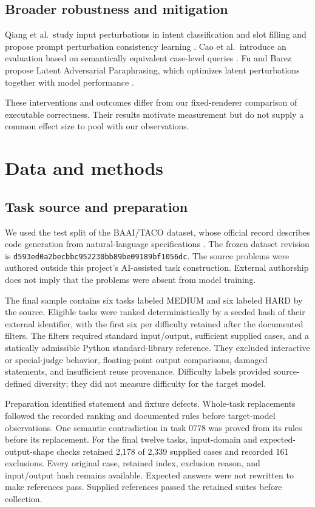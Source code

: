 \documentclass[conference,a4paper]{IEEEtran}
\newcommand{\evidencecite}[3]{\cite[#3]{#2}}
\begin{document}
\subsection{Broader robustness and mitigation}
Qiang et al.\ study input perturbations in intent classification and slot filling and propose prompt perturbation consistency learning \evidencecite{C06}{qiang-etal-2024-prompt}{p.~1357}. Cao et al.\ introduce an evaluation based on semantically equivalent case-level queries \evidencecite{C09}{NEURIPS2024_7fa5a377}{p.~1}. Fu and Barez propose Latent Adversarial Paraphrasing, which optimizes latent perturbations together with model performance \evidencecite{C10}{fu-barez-2025-question}{p.~31305}.

These interventions and outcomes differ from our fixed-renderer comparison of executable correctness. Their results motivate measurement but do not supply a common effect size to pool with our observations.

\section{Data and methods}
\subsection{Task source and preparation}
We used the test split of the BAAI/TACO dataset, whose official record describes code generation from natural-language specifications \evidencecite{C11}{taco-dataset}{dataset card}. The frozen dataset revision is \texttt{d593ed0a2becbbc952230bb89be09189bf1056dc}. The source problems were authored outside this project's AI-assisted task construction. External authorship does not imply that the problems were absent from model training.

The final sample contains six tasks labeled MEDIUM and six labeled HARD by the source. Eligible tasks were ranked deterministically by a seeded hash of their external identifier, with the first six per difficulty retained after the documented filters. The filters required standard input/output, sufficient supplied cases, and a statically admissible Python standard-library reference. They excluded interactive or special-judge behavior, floating-point output comparisons, damaged statements, and insufficient reuse provenance. Difficulty labels provided source-defined diversity; they did not measure difficulty for the target model.

Preparation identified statement and fixture defects. Whole-task replacements followed the recorded ranking and documented rules before target-model observations. One semantic contradiction in task 0778 was proved from its rules before its replacement. For the final twelve tasks, input-domain and expected-output-shape checks retained 2,178 of 2,339 supplied cases and recorded 161 exclusions. Every original case, retained index, exclusion reason, and input/output hash remains available. Expected answers were not rewritten to make references pass. Supplied references passed the retained suites before collection.
\end{document}
